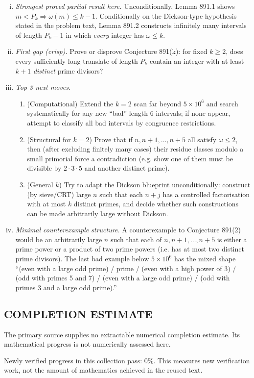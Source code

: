 \begin{enumerate}[(i)]
\item \emph{Strongest proved partial result here.} Unconditionally, Lemma 891.1 shows $m<P_k\Rightarrow \omega(m)\le k-1$. Conditionally on the Dickson-type hypothesis stated in the problem text, Lemma 891.2 constructs infinitely many intervals of length $P_k-1$ in which \emph{every} integer has $\omega\le k$.

\item \emph{First gap (crisp).} Prove or disprove Conjecture 891(k): for fixed $k\ge 2$, does every sufficiently long translate of length $P_k$ contain an integer with at least $k+1$ \emph{distinct} prime divisors?

\item \emph{Top 3 next moves.}
  \begin{enumerate}
  \item (Computational) Extend the $k=2$ scan far beyond $5\times 10^6$ and search systematically for any new ``bad'' length-$6$ intervals; if none appear, attempt to classify all bad intervals by congruence restrictions.
  \item (Structural for $k=2$) Prove that if $n,n+1,\dots,n+5$ all satisfy $\omega\le 2$, then (after excluding finitely many cases) their residue classes modulo a small primorial force a contradiction (e.g. show one of them must be divisible by $2\cdot 3\cdot 5$ and another distinct prime).
  \item (General $k$) Try to adapt the Dickson blueprint unconditionally: construct (by sieve/CRT) large $n$ such that each $n+j$ has a controlled factorisation with at most $k$ distinct primes, and decide whether such constructions can be made arbitrarily large without Dickson.
  \end{enumerate}

\item \emph{Minimal counterexample structure.} A counterexample to Conjecture 891(2) would be an arbitrarily large $n$ such that each of $n,n+1,\dots,n+5$ is either a prime power or a product of two prime powers (i.e. has at most two distinct prime divisors). The last bad example below $5\times 10^6$ has the mixed shape ``(even with a large odd prime) / prime / (even with a high power of 3) / (odd with primes 5 and 7) / (even with a large odd prime) / (odd with primes 3 and a large odd prime).''
\end{enumerate}



\subsection*{COMPLETION ESTIMATE}
The primary source supplies no extractable numerical completion estimate. Its mathematical progress is not numerically assessed here.

Newly verified progress in this collection pass: $0\%$. This measures new verification work, not the amount of mathematics achieved in the reused text.
